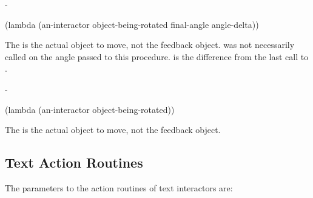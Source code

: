 \begin{description}
 -
\begin{programinlist}
(lambda (an-interactor object-being-rotated final-angle angle-delta))
\end{programinlist}
The  is the actual object
to move, not the feedback object.   was not
necessarily called on the angle passed to this procedure.  
is the difference from the last call to .



 -
\begin{programinlist}
(lambda (an-interactor object-being-rotated))
\end{programinlist}
The  is the actual object
to move, not the feedback object.


\end{description}


\subsection{Text Action Routines}
\label{textcustomaction}

The parameters to the action routines of text interactors are:


